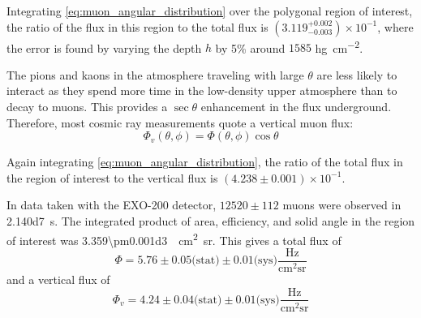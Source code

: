 \documentclass[herrin-thesis.tex]{subfiles}
\begin{document}
Integrating \cref{eq:muon_angular_distribution} over the polygonal region of interest, the ratio of the flux in this region to the total flux is \((3.119^{+0.002}_{-0.003})\times10^{-1}\), where the error is found by varying the depth \(h\) by 5\% around \(1585\) \si{\hecto\gram\per\square\centi\meter}.

The pions and kaons in the atmosphere traveling with large \(\theta\) are less likely to interact as they spend more time in the low-density upper atmosphere than to decay to muons. This provides a \(\sec\theta\) enhancement in the flux underground. Therefore, most cosmic ray measurements quote a vertical muon flux:
\begin{equation}
\label{eq:muon_vfluxdef}
\Phi_v(\theta, \phi) = \Phi(\theta, \phi)\cos\theta
\end{equation}

Again integrating \cref{eq:muon_angular_distribution}, the ratio of the total flux in the region of interest to the vertical flux is \((4.238\pm0.001)\times10^{-1}\).

In data taken with the EXO-200 detector, \(12520\pm112\) muons were observed in \SI{2.140d7}{\second}. The integrated product of area, efficiency, and solid angle in the region of interest was \SI{3.359\pm0.001d3}{\per\square\centi\meter\steradian}. This gives a total flux of
\begin{equation}
\label{eq:muon_flux_result}
\Phi = 5.76\pm0.05\text{(stat)}\pm0.01\text{(sys)}\frac{\text{Hz}}{\text{cm}^2\text{sr}}
\end{equation}
and a vertical flux of
\begin{equation}
\label{eq:muon_vflux_result}
\Phi_v = 4.24\pm0.04\text{(stat)}\pm0.01\text{(sys)}\frac{\text{Hz}}{\text{cm}^2\text{sr}}
\end{equation}

%
%
\end{document}
